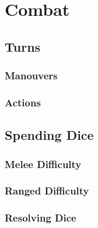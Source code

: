 \chapter{Combat}\label{chap:combat}
\begin{multicols}{2}

\section{Turns}
\subsection{Manouvers}
\subsection{Actions}

\section{Spending Dice}
\subsection{Melee Difficulty}
\subsection{Ranged Difficulty}
\subsection{Resolving Dice}

\end{multicols}

